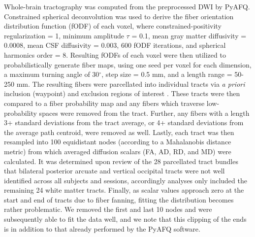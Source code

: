 \documentclass[12pt]{article}
\begin{document}
Whole-brain tractography was computed from the preprocessed DWI by PyAFQ. Constrained spherical deconvolution was used to derive the fiber orientation distribution function (fODF) of each voxel, where constrained-positivity regularization = 1, minimum amplitude $\tau$ = 0.1, mean gray matter diffusivity = 0.0008, mean CSF diffusivity = 0.003, 600 fODF iterations, and spherical harmonics order = 8. Resulting fODFs of each voxel were then utilized to probabilistically generate fiber maps, using one seed per voxel for each dimension, a maximum turning angle of 30$^\circ$, step size = 0.5 mm, and a length range = 50-250 mm. The resulting fibers were parcellated into individual tracts via \textit{a priori} inclusion (waypoint) and exclusion regions of interest \parencite{wakana2007ReproducibilityQuantitativeTractography}. These tracts were then compared to a fiber probability map \parencite{hua2008TractProbabilityMaps} and any fibers which traverse low-probability spaces were removed from the tract. Further, any fibers with a length 3+ standard deviations from the tract average, or 4+ standard deviations from the average path centroid, were removed as well. Lastly, each tract was then resampled into 100 equidistant nodes (according to a Mahalanobis distance metric) from which averaged diffusion scalars (FA, AD, RD, and MD) were calculated. It was determined upon review of the 28 parcellated tract bundles that bilateral posterior arcuate and vertical occipital tracts were not well identified across all subjects and sessions, accordingly analyses only included the remaining 24 white matter tracts. Finally, as scalar values approach zero at the start and end of tracts due to fiber fanning, fitting the distribution becomes rather problematic. We removed the first and last 10 nodes and were subsequently able to fit the data well, and we note that this clipping of the ends is in addition to that already performed by the PyAFQ software.
\end{document}

